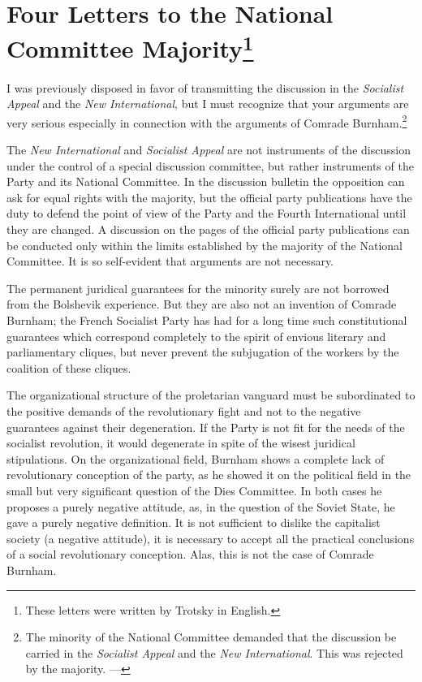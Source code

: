 \chapter[Four Letters to the National Committee Majority]{Four Letters to the National Committee Majority\footnote{These letters were written by Trotsky in English.}}


I was previously disposed in favor of transmitting the discussion in the \emph{Socialist Appeal} and the \emph{New International}, but I must recognize that your arguments are very serious especially in connection with the arguments of Comrade Burnham.\footnote{The minority of the National Committee demanded that the discussion be carried in the \emph{Socialist Appeal} and the \emph{New International}. This was rejected by the majority. ---\ed}

The \emph{New International} and \emph{Socialist Appeal} are not instruments of the discussion under the control of a special discussion committee, but rather instruments of the Party and its National Committee. In the discussion bulletin the opposition can ask for equal rights with the majority, but the official party publications have the duty to defend the point of view of the Party and the Fourth International until they are changed. A discussion on the pages of the official party publications can be conducted only within the limits established by the majority of the National Committee. It is so self-evident that arguments are not necessary.

The permanent juridical guarantees for the minority surely are not borrowed from the Bolshevik experience. But they are also not an invention of Comrade Burnham; the French Socialist Party has had for a long time such constitutional guarantees which correspond completely to the spirit of envious literary and parliamentary cliques, but never prevent the subjugation of the workers by the coalition of these cliques.

The organizational structure of the proletarian vanguard must be subordinated to the positive demands of the revolutionary fight and not to the negative guarantees against their degeneration. If the Party is not fit for the needs of the socialist revolution, it would degenerate in spite of the wisest juridical stipulations. On the organizational field, Burnham shows a complete lack of revolutionary conception of the party, as he showed it on the political field in the small but very significant question of the Dies Committee. In both cases he proposes a purely negative attitude, as, in the question of the Soviet State, he gave a purely negative definition. It is not sufficient to dislike the capitalist society (a negative attitude), it is necessary to accept all the practical conclusions of a social revolutionary conception. Alas, this is not the case of Comrade Burnham.

